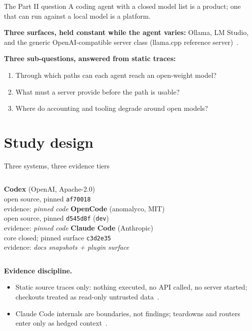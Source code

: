 \documentclass[aspectratio=169,11pt]{beamer}
\newcommand{\codex}[0]{Codex}
\newcommand{\occ}[0]{OpenCode}
\newcommand{\ccc}[0]{Claude Code}
\begin{document}
\begin{frame}{The Part II question}
  A coding agent with a closed model list is a product; one that can run
  against a local model is a platform.

  \vspace{0.4em}
  \textbf{Three surfaces, held constant while the agent varies:}
  Ollama, LM Studio, and the generic OpenAI-compatible server class
  (llama.cpp reference
  server)~\citep{ollamaCompatDocs,lmstudioApiDocs,llamaCppServerDocs}.

  \vspace{0.4em}
  \textbf{Three sub-questions, answered from static traces:}
  \begin{enumerate}
    \item Through which paths can each agent reach an open-weight model?
    \item What must a server provide before the path is usable?
    \item Where do accounting and tooling degrade around open models?
  \end{enumerate}
\end{frame}

\section{Study design}

\begin{frame}{Three systems, three evidence tiers}
  \begin{columns}[T]
      \textbf{\codex{}} (OpenAI, Apache-2.0)\\
      open source, pinned \texttt{af70018}\\
      evidence: \emph{pinned code}
      \textbf{\occ{}} (anomalyco, MIT)\\
      open source, pinned \texttt{d545d8f} (\texttt{dev})\\
      evidence: \emph{pinned code}
      \textbf{\ccc{}} (Anthropic)\\
      core closed; pinned surface \texttt{c3d2e35}\\
      evidence: \emph{docs snapshots + plugin surface}
  \end{columns}

  \medskip
  \textbf{Evidence discipline.}
  \begin{itemize}
    \item Static source traces only: nothing executed, no API called, no
      server started; checkouts treated as read-only untrusted
      data~\citep{codexRepo,opencodeRepo,claudeCodePluginSurface}.
    \item \ccc{} internals are boundaries, not findings; teardowns and
      routers enter only as hedged
      context~\citep{minusXClaudeCodeTeardown,agiflowClaudeCodeInternals,tenguDecoded,%
      claudeCodeRouterContext}.
  \end{itemize}
\end{frame}
\end{document}
